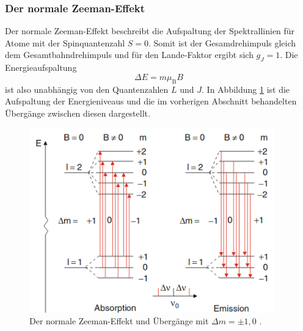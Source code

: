 \subsubsection*{Der normale Zeeman-Effekt}
Der normale Zeeman-Effekt beschreibt die Aufspaltung der Spektrallinien für Atome mit der Spinquantenzahl $S=0$. Somit ist der Gesamdrehimpuls gleich dem Gesamtbahndrehimpuls und für den Lande-Faktor ergibt sich $g_J=1$. Die Energieaufspaltung
\begin{equation}
\Delta E = m \mu_\text{B}B
\end{equation}
ist also unabhängig von den Quantenzahlen $L$ und $J$. In Abbildung \ref{fig:tfig3} ist die Aufspaltung der Energieniveaus und die im vorherigen Abschnitt behandelten Übergänge zwischen diesen dargestellt.
\begin{figure}
\centering
\includegraphics[height=8.0cm]{normalzeeman.png}
\caption{Der normale Zeeman-Effekt und Übergänge mit $\Delta m = \pm 1, 0$ \cite{quelle01}.}
\label{fig:tfig3}
\end{figure}

